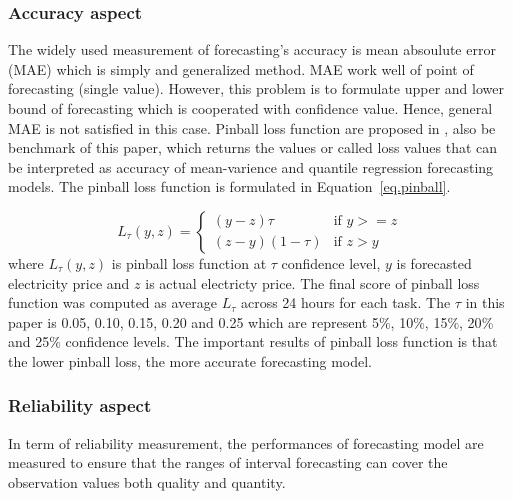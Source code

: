 \documentclass[review]{elsarticle}
\begin{document}
      \subsubsection{Accuracy aspect}
        The widely used measurement of forecasting's accuracy is mean absoulute error (MAE) which is simply and generalized method.
        MAE work well of point of forecasting (single value).
        However, this problem is to formulate upper and lower bound of forecasting which is cooperated with confidence value.
        Hence, general MAE is not satisfied in this case.
        Pinball loss function are proposed in \cite{Maciejowska2016}, also be benchmark of this paper, which returns the values or called loss values that can be interpreted as accuracy of mean-varience and quantile regression forecasting models.
        The pinball loss function is formulated in Equation~\ref{eq.pinball}.

        \begin{equation}
          L_{\tau}(y,z) =
          \begin{cases}
            (y-z)\tau & \text{if  $y>=z$} \\
            (z-y)(1-\tau) & \text{if  $z>y$}
          \end{cases}
          \label{eq.pinball}
        \end{equation}
        where $L_{\tau}(y,z)$ is pinball loss function at $\tau$ confidence level, $y$ is forecasted electricity price and $z$ is actual electricty price.
        The final score of pinball loss function was computed as average $L_{\tau}$ across 24 hours for each task.
        The $\tau$ in this paper is 0.05, 0.10, 0.15, 0.20 and 0.25 which are represent 5$\%$, 10$\%$, 15$\%$, 20$\%$ and 25$\%$ confidence levels.
        The important results of pinball loss function is that the lower pinball loss, the more accurate forecasting model.

      \subsubsection{Reliability aspect}
        In term of reliability measurement, the performances of forecasting model are measured to ensure that the ranges of interval forecasting can cover the observation values both quality and quantity.
\end{document}
